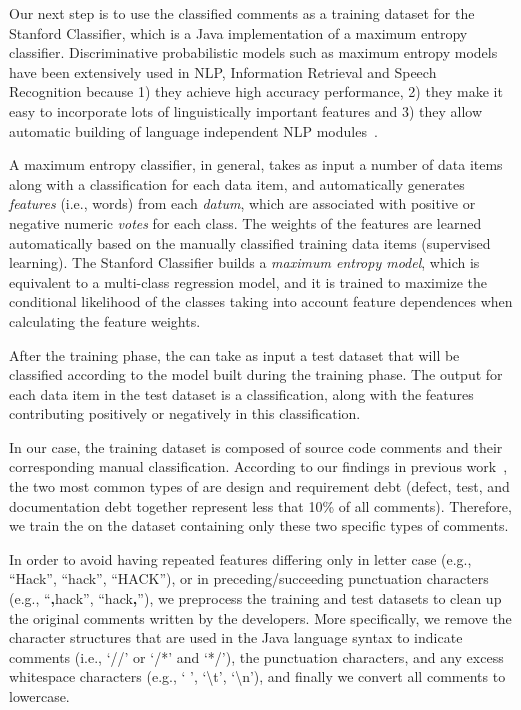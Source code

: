 Our next step is to use the classified \SATD comments as a training dataset for the Stanford Classifier, which is a Java implementation of a maximum entropy classifier. Discriminative probabilistic models such as maximum entropy models have been extensively used in NLP, Information Retrieval and Speech Recognition because 1) they achieve high accuracy performance, 2) they make it easy to incorporate lots of linguistically important features and 3) they allow automatic building of language independent NLP modules~\cite{manning2003optimization}.

A maximum entropy classifier, in general, takes as input a number of data items along with a classification for each data item, and automatically generates \textit{features} (i.e., words) from each \textit{datum}, which are associated with positive or negative numeric \textit{votes} for each class. The weights of the features are learned automatically based on the manually classified training data items (supervised learning). The Stanford Classifier builds a \textit{maximum entropy model}, which is equivalent to a multi-class regression model, and it is trained to maximize the conditional likelihood of the classes taking into account feature dependences when calculating the feature weights.

After the training phase, the  can take as input a test dataset that will be classified according to the model built during the training phase. The output for each data item in the test dataset is a classification, along with the features contributing positively or negatively in this classification.

In our case, the training dataset is composed of source code comments and their corresponding manual classification.
According to our findings in previous work~\cite{Maldonado2015MTD}, the two most common types of \SATD are design and requirement debt (defect, test, and documentation debt together represent less that 10\% of all \SATD comments).
Therefore, we train the on the dataset containing only these two specific types of \SATD comments.

In order to avoid having repeated features differing only in letter case (e.g., ``Hack'', ``hack'', ``HACK''), or in preceding/succeeding punctuation characters (e.g., ``\textbf{,}hack'', ``hack\textbf{,}''), we preprocess the training and test datasets to clean up the original comments written by the developers. More specifically, we remove the character structures that are used in the Java language syntax to indicate comments (i.e., `//' or `/*' and `*/'), the punctuation characters, and any excess whitespace characters (e.g., ` ', `\textbackslash t', `\textbackslash n'), and finally we convert all comments to lowercase. 